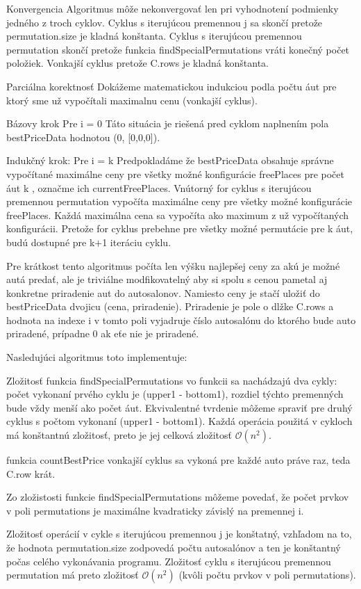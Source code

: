 \documentclass[paper=a4, fontsize=11pt]{scrartcl} %
\numberwithin{equation}{section} %
\numberwithin{figure}{section} %
\numberwithin{table}{section} %
\begin{document}
Konvergencia
Algoritmus môže nekonvergovať len pri vyhodnotení podmienky jedného z troch cyklov.
Cyklus s iterujúcou premennou j sa skončí pretože permutation.size je kladná konštanta.
Cyklus s iterujúcou premennou permutation skončí pretože funkcia findSpecialPermutations vráti konečný počet položiek.
Vonkajší cyklus pretože C.rows je kladná konštanta.


Parciálna korektnosť
Dokážeme matematickou indukciou podla počtu áut pre ktorý sme už vypočítali maximalnu cenu (vonkajší cyklus).

Bázovy krok
Pre i = 0
Táto situácia je riešená pred cyklom naplnením pola bestPriceData hodnotou (0, [0,0,0]).

Indukčný krok:
Pre i = k
Predpokladáme že bestPriceData obsahuje správne vypočítané maximálne ceny pre všetky možné konfigurácie freePlaces pre počet áut k , označme ich currentFreePlaces.
Vnútorný for cyklus s iterujúcou premennou permutation vypočíta maximálne ceny pre všetky možné konfigurácie freePlaces. Každá maximálna cena sa vypočíta ako maximum z už vypočítaných konfigurácii.
Pretože for cyklus prebehne pre všetky možné permutácie pre k áut, budú dostupné pre k+1 iteráciu cyklu.

Pre krátkost tento algoritmus počíta len výšku najlepšej ceny za akú je možné autá predať, ale je triviálne modfikovatelný aby si spolu s cenou pametal aj konkretne priradenie aut do autosalonov.
Namiesto ceny je stačí uložiť do bestPriceData dvojicu (cena, priradenie). Priradenie je pole o dlžke C.rows a hodnota na indexe i v tomto poli vyjadruje číslo autosalónu do ktorého bude auto priradené, prípadne 0 ak eťe nie je priradené.

Nasledujúci algoritmus toto implementuje:

Zložitosť
funkcia findSpecialPermutations
vo funkcii sa nachádzajú dva cykly:
počet vykonaní prvého cyklu je (upper1 - bottom1), rozdiel týchto premenných bude vždy menší ako počet áut.
Ekvivalentné tvrdenie môžeme spraviť pre druhý cyklus s počtom vykonaní (upper1 - bottom1).
Každá operácia použitá v cykloch má konštantnú zložitosť, preto je jej celková zložitosť $\mathcal{O}(n^2)$.

funkcia countBestPrice
vonkajší cyklus sa vykoná pre každé auto práve raz, teda C.row krát.

Zo zložistosti funkcie findSpecialPermutations môžeme povedať, že počet prvkov v poli permutations je maximálne kvadraticky závislý na premennej i.

Zložitosť operácií v cykle s iterujúcou premennou j je konštatný, vzhľadom na to, že hodnota permutation.size zodpovedá počtu autosalónov a ten je konštantný počas celého vykonávania programu.
Zložitosť cyklu s iterujúcou premennou permutation má preto zložitosť $\mathcal{O}(n^2)$ (kvôli počtu prvkov v poli permutations).
\end{document}
